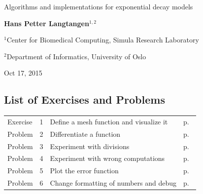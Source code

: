 \documentclass[%
oneside,                 %
final,                   %
10pt]{article}
\begin{document}







\thispagestyle{empty}

\begin{center}
{\LARGE\bf
\begin{spacing}{1.25}
Algorithms and implementations for exponential decay models
\end{spacing}
}
\end{center}


\begin{center}
{\bf Hans Petter Langtangen${}^{1, 2}$} \\ [0mm]
\end{center}

\begin{center}
\centerline{{\small ${}^1$Center for Biomedical Computing, Simula Research Laboratory}}
\centerline{{\small ${}^2$Department of Informatics, University of Oslo}}
\end{center}
    

\begin{center}
Oct 17, 2015
\end{center}

\vspace{1cm}


\tableofcontents

\clearpage %
\subsection*{List of Exercises and Problems}
\begin{tabular}{lrll}
Exercise & 1 & Define a mesh function and visualize it & p.~\pageref{decay:exer:meshfunc} \\
Problem & 2 & Differentiate a function & p.~\pageref{decay:exer:dudt} \\
Problem & 3 & Experiment with divisions & p.~\pageref{decay:exer:intdiv} \\
Problem & 4 & Experiment with wrong computations & p.~\pageref{decay:exer:decay1err} \\
Problem & 5 & Plot the error function & p.~\pageref{decay:exer:plot:error} \\
Problem & 6 & Change formatting of numbers and debug & p.~\pageref{decay:exer:inexact:output} \\
\end{tabular}
\clearpage %
\end{document}
